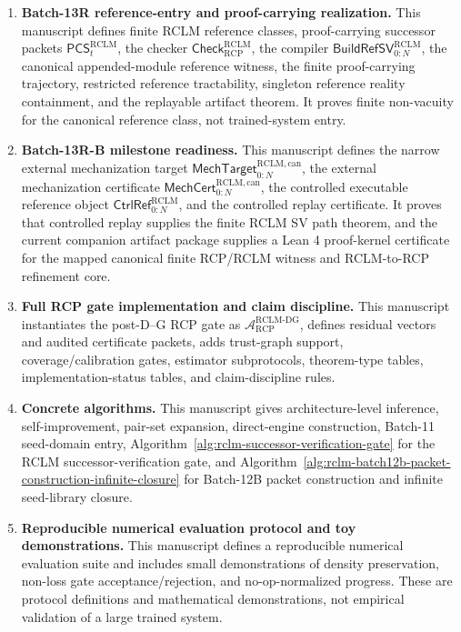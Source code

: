 \documentclass[11pt,a4paper]{article}
\newcommand{\Acal}{\mathcal A}
\newcommand{\RCP}{\mathrm{RCP}}
\newcommand{\RCLM}{\mathrm{RCLM}}
\newcommand{\DG}{\mathrm{DG}}
\begin{document}
\begin{enumerate}[label=(\arabic*),leftmargin=1.5em]
    \item \textbf{Batch-13R reference-entry and proof-carrying realization.} This manuscript defines finite RCLM reference classes, proof-carrying successor packets \(\mathsf{PCS}_t^{\RCLM}\), the checker \(\mathsf{Check}_{\RCP}^{\RCLM}\), the compiler \(\mathsf{BuildRefSV}_{0:N}^{\RCLM}\), the canonical appended-module reference witness, the finite proof-carrying trajectory, restricted reference tractability, singleton reference reality containment, and the replayable artifact theorem.  It proves finite non-vacuity for the canonical reference class, not trained-system entry.
    \item \textbf{Batch-13R-B milestone readiness.} This manuscript defines the narrow external mechanization target \(\mathsf{MechTarget}_{0:N}^{\RCLM,\mathrm{can}}\), the external mechanization certificate \(\mathsf{MechCert}_{0:N}^{\RCLM,\mathrm{can}}\), the controlled executable reference object \(\mathsf{CtrlRef}_{0:N}^{\RCLM}\), and the controlled replay certificate. It proves that controlled replay supplies the finite RCLM SV path theorem, and the current companion artifact package supplies a Lean 4 proof-kernel certificate for the mapped canonical finite RCP/RCLM witness and RCLM-to-RCP refinement core.
    \item \textbf{Full RCP gate implementation and claim discipline.} This manuscript instantiates the post-D--G RCP gate as \(\Acal_{\RCP}^{\RCLM\text{-}\DG}\), defines residual vectors and audited certificate packets, adds trust-graph support, coverage/calibration gates, estimator subprotocols, theorem-type tables, implementation-status tables, and claim-discipline rules.
    \item \textbf{Concrete algorithms.} This manuscript gives architecture-level inference, self-improvement, pair-set expansion, direct-engine construction, Batch-11 seed-domain entry, Algorithm~\ref{alg:rclm-successor-verification-gate} for the RCLM successor-verification gate, and Algorithm~\ref{alg:rclm-batch12b-packet-construction-infinite-closure} for Batch-12B packet construction and infinite seed-library closure.
    \item \textbf{Reproducible numerical evaluation protocol and toy demonstrations.} This manuscript defines a reproducible numerical evaluation suite and includes small demonstrations of density preservation, non-loss gate acceptance/rejection, and no-op-normalized progress.  These are protocol definitions and mathematical demonstrations, not empirical validation of a large trained system.
\end{enumerate}
\end{document}
